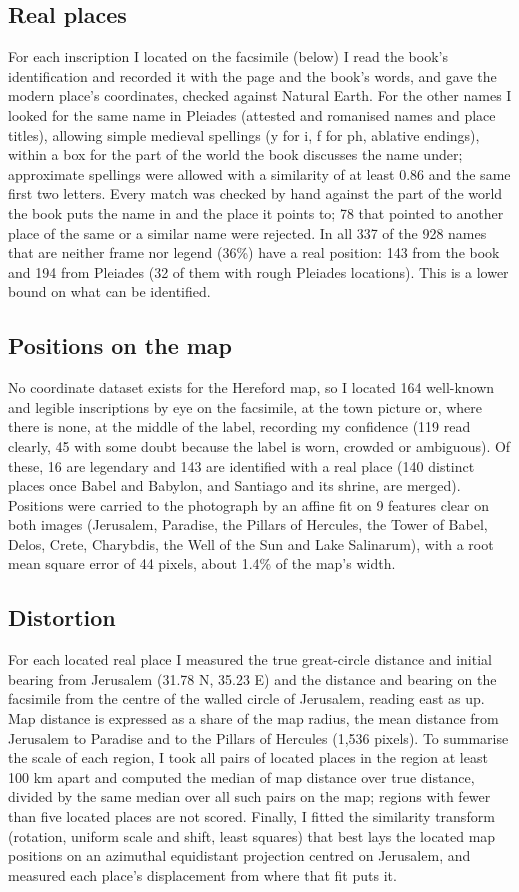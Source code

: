 \documentclass[11pt,a4paper]{article}
\begin{document}
\subsection{Real places}
For each inscription I located on the facsimile (below) I read the book's identification and recorded it with the page and the book's words, and gave the modern place's coordinates, checked against Natural Earth. For the other names I looked for the same name in Pleiades (attested and romanised names and place titles), allowing simple medieval spellings (y for i, f for ph, ablative endings), within a box for the part of the world the book discusses the name under; approximate spellings were allowed with a similarity of at least 0.86 and the same first two letters. Every match was checked by hand against the part of the world the book puts the name in and the place it points to; 78 that pointed to another place of the same or a similar name were rejected. In all 337 of the 928 names that are neither frame nor legend (36\%) have a real position: 143 from the book and 194 from Pleiades (32 of them with rough Pleiades locations). This is a lower bound on what can be identified.

\subsection{Positions on the map}
No coordinate dataset exists for the Hereford map, so I located 164 well-known and legible inscriptions by eye on the facsimile, at the town picture or, where there is none, at the middle of the label, recording my confidence (119 read clearly, 45 with some doubt because the label is worn, crowded or ambiguous). Of these, 16 are legendary and 143 are identified with a real place (140 distinct places once Babel and Babylon, and Santiago and its shrine, are merged). Positions were carried to the photograph by an affine fit on 9 features clear on both images (Jerusalem, Paradise, the Pillars of Hercules, the Tower of Babel, Delos, Crete, Charybdis, the Well of the Sun and Lake Salinarum), with a root mean square error of 44 pixels, about 1.4\% of the map's width.

\subsection{Distortion}
For each located real place I measured the true great-circle distance and initial bearing from Jerusalem (31.78 N, 35.23 E) and the distance and bearing on the facsimile from the centre of the walled circle of Jerusalem, reading east as up. Map distance is expressed as a share of the map radius, the mean distance from Jerusalem to Paradise and to the Pillars of Hercules (1,536 pixels). To summarise the scale of each region, I took all pairs of located places in the region at least 100 km apart and computed the median of map distance over true distance, divided by the same median over all such pairs on the map; regions with fewer than five located places are not scored. Finally, I fitted the similarity transform (rotation, uniform scale and shift, least squares) that best lays the located map positions on an azimuthal equidistant projection centred on Jerusalem, and measured each place's displacement from where that fit puts it.
\end{document}
